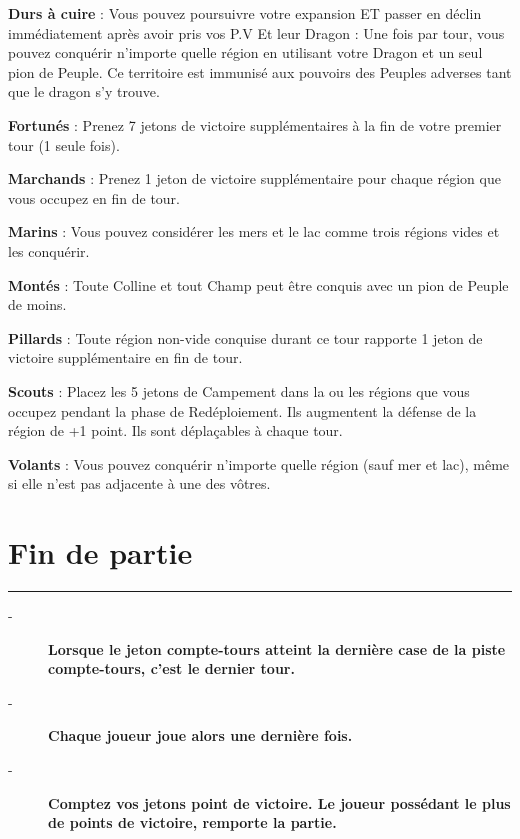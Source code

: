 \documentclass{scrartcl}%
\begin{document}
\begin{description}
%
\textbf{Durs à cuire}%
\textit{ }%
 : Vous pouvez poursuivre votre expansion ET passer en déclin immédiatement après avoir pris vos P.V Et leur Dragon : Une fois par tour, vous pouvez conquérir n'importe quelle région en utilisant votre Dragon et un seul pion de Peuple. Ce territoire est immunisé aux pouvoirs des Peuples adverses tant que le dragon s'y trouve.
%
\item[{-} ]%
%
\textbf{Fortunés}%
\textit{ }%
 : Prenez 7 jetons de victoire supplémentaires à la fin de votre premier tour (1 seule fois). 
%
\item[{-} ]%
%
\textbf{Marchands}%
: Prenez 1 jeton de victoire supplémentaire pour chaque région que vous occupez en fin de tour.
%
\item[{-} ]%
%
\textbf{Marins}%
\textit{ }%
 : Vous pouvez considérer les mers et le lac comme trois régions vides et les conquérir.
%
\item[{-} ]%
%
\textbf{Montés}%
\textit{ }%
 : Toute Colline et tout Champ peut être conquis avec un pion de Peuple de moins.
%
\item[{-} ]%
%
\textbf{Pillards}%
\textit{ }%
 : Toute région non{-}vide conquise durant ce tour rapporte 1 jeton de victoire supplémentaire en fin de tour.
%
\item[{-} ]%
%
\textbf{Scouts}%
\textit{ }%
 : Placez les 5 jetons de Campement dans la ou les régions que vous occupez pendant la phase de Redéploiement. Ils augmentent la défense de la région de +1 point. Ils sont déplaçables à chaque tour.
%
\item[{-} ]%
%
\textbf{Volants}%
\textit{ }%
 : Vous pouvez conquérir n'importe quelle région (sauf mer et lac), même si elle n'est pas adjacente à une des vôtres.
%
\end{description}

%
\section{ Fin de partie
}%
\label{sec:Findepartie}%
\rule{18cm}{0.07cm}\break%
\begin{description}%
\item[{-} ]%
%
\textbf{Lorsque le jeton compte{-}tours atteint la dernière case de la piste compte{-}tours, c’est le dernier tour.}%

%
\item[{-} ]%
%
\textbf{Chaque joueur joue alors une dernière fois.}%

%
\item[{-} ]%
%
\textbf{Comptez vos jetons point de victoire. Le joueur possédant le plus de points de victoire, remporte la partie.}%
\end{description}

%
\end{document}
